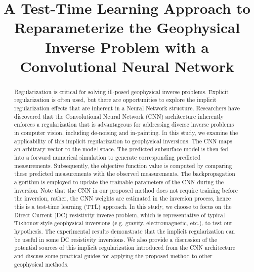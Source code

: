 \documentclass[lettersize,journal]{IEEEtran}
\begin{document}
\title{A Test-Time Learning Approach to Reparameterize the Geophysical Inverse Problem with a Convolutional Neural Network}


\maketitle

\begin{abstract}
Regularization is critical for solving ill-posed geophysical inverse problems. Explicit regularization is often used, but there are opportunities to explore the implicit regularization effects that are inherent in a Neural Network structure.  Researchers have discovered that the Convolutional Neural Network (CNN) architecture inherently enforces a regularization that is advantageous for addressing diverse inverse problems in computer vision, including de-noising and in-painting. In this study, we examine the applicability of this implicit regularization to geophysical inversions. The CNN maps an arbitrary vector to the model space. The predicted subsurface model is then fed into a forward numerical simulation to generate corresponding predicted measurements. Subsequently, the objective function value is computed by comparing these predicted measurements with the observed measurements. The backpropagation algorithm is employed to update the trainable parameters of the CNN during the inversion. Note that the CNN in our proposed method does not require training before the inversion, rather, the CNN weights are estimated in the inversion process, hence this is a test-time learning (TTL) approach. In this study, we choose to focus on the Direct Current (DC) resistivity inverse problem, which is representative of typical Tikhonov-style geophysical inversions (e.g. gravity, electromagnetic, etc.), to test our hypothesis. The experimental results demonstrate that the implicit regularization can be useful in some DC resistivity inversions. We also provide a discussion of the potential sources of this implicit regularization introduced from the CNN architecture and discuss some practical guides for applying the proposed method to other geophysical methods.

\end{abstract}
\end{document}
